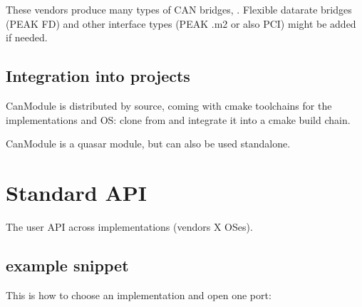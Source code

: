 \documentclass[a4paper,10pt,english]{sphinxmanual}
\begin{document}
These vendors produce many types of CAN bridges, . Flexible datarate bridges (PEAK FD) and other interface types
(PEAK .m2 or also PCI) might be added if needed.


\section{Integration into projects}
\label{\detokenize{objective:integration-into-projects}}
CanModule is distributed by source, coming with cmake toolchains for the implementations and OS:
clone from  and integrate it into a cmake build chain.

CanModule is a quasar module, but can also be used stand\sphinxhyphen{}alone.


\chapter{Standard API}
\label{\detokenize{standardApi:standard-api}}\label{\detokenize{standardApi::doc}}
The user API  across implementations (vendors X OSes).


\section{example snippet}
\label{\detokenize{standardApi:example-snippet}}
This is how to choose an implementation and open one port:
\end{document}

